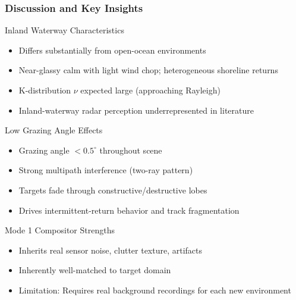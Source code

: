 \documentclass[aspectratio=169, 10pt]{beamer}
\begin{document}
\begin{frame}
  \frametitle{Discussion and Key Insights}
  \vspace{-0.3cm}

  \begin{block}{Inland Waterway Characteristics}
    \scriptsize
    \begin{itemize}\setlength{\itemsep}{0pt}\setlength{\topsep}{0pt}\setlength{\parsep}{0pt}
      \item Differs substantially from open-ocean environments
      \item Near-glassy calm with light wind chop; heterogeneous shoreline returns
      \item K-distribution $\nu$ expected large (approaching Rayleigh)
      \item Inland-waterway radar perception underrepresented in literature
    \end{itemize}
  \end{block}
  \vspace{-0.15cm}

  \begin{block}{Low Grazing Angle Effects}
    \scriptsize
    \begin{itemize}\setlength{\itemsep}{0pt}\setlength{\topsep}{0pt}\setlength{\parsep}{0pt}
      \item Grazing angle $< 0.5^{\circ}$ throughout scene
      \item Strong multipath interference (two-ray pattern)
      \item Targets fade through constructive/destructive lobes
      \item Drives intermittent-return behavior and track fragmentation
    \end{itemize}
  \end{block}
  \vspace{-0.15cm}

  \begin{block}{Mode 1 Compositor Strengths}
    \scriptsize
    \begin{itemize}\setlength{\itemsep}{0pt}\setlength{\topsep}{0pt}\setlength{\parsep}{0pt}
      \item Inherits real sensor noise, clutter texture, artifacts
      \item Inherently well-matched to target domain
      \item Limitation: Requires real background recordings for each new environment
    \end{itemize}
  \end{block}
\end{frame}
\end{document}

